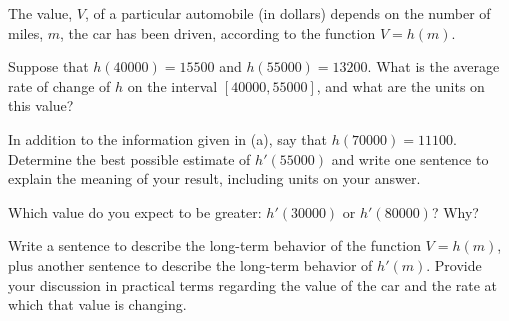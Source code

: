 \begin{exercises}
\item The value, $V$, of a particular automobile (in dollars) depends on the number of miles, $m$, the car has been driven, according to the function $V = h(m)$.  
\ba
	\item Suppose that $h(40000) = 15500$ and $h(55000) = 13200$.  What is the average rate of change of $h$ on the interval $[40000,55000]$, and what are the units on this value?
	\item In addition to the information given in (a), say that $h(70000) = 11100$.  Determine the best possible estimate of $h'(55000)$ and write one sentence to explain the meaning of your result, including units on your answer.
	\item Which value do you expect to be greater: $h'(30000)$ or $h'(80000)$?  Why?
	\item Write a sentence to describe the long-term behavior of the function $V = h(m)$, plus another sentence to describe the long-term behavior of $h'(m)$.  Provide your discussion in practical terms regarding the value of the car and the rate at which that value is changing.
\ea
\end{exercises}
\afterexercises